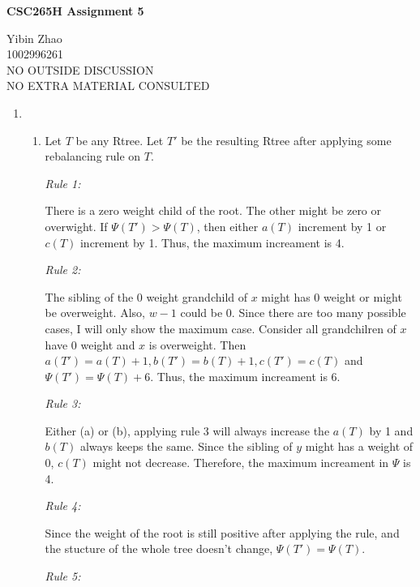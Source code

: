 \documentclass[10pt]{article}
\begin{document}
\begin{center}
{\bf \Large \bf CSC265H Assignment 5}
\end{center}

\noindent
Yibin Zhao\\
1002996261\\
NO OUTSIDE DISCUSSION\\
NO EXTRA MATERIAL CONSULTED\\

\begin{enumerate}
	\item 
		\begin{enumerate}
			\item
				Let $T$ be any Rtree.
				Let $T'$ be the resulting Rtree after applying some rebalancing
				rule on $T$. 
				
				\textit{Rule 1:}
				\begin{addmargin}[1em]{0em}
					There is a zero weight child of the root.
					The other might be zero or overwight.
					If $\Psi(T') > \Psi(T)$, then either $a(T)$ increment by 1
					or $c(T)$ increment by 1.
					Thus, the maximum increament is 4.
				\end{addmargin}
				\textit{Rule 2:}
				\begin{addmargin}[1em]{0em}
					The sibling of the 0 weight grandchild of $x$ might has 0
					weight or might be overweight.
					Also, $w-1$ could be 0.
					Since there are too many possible cases, I will only show
					the maximum case.
					Consider all grandchilren of $x$ have 0 weight and $x$ is overweight.
					Then $a(T') = a(T)+1, b(T') = b(T)+1, c(T') = c(T)$ and
					$\Psi(T') = \Psi(T) + 6$.
					Thus, the maximum increament is 6.
				\end{addmargin}
				\textit{Rule 3:}
				\begin{addmargin}[1em]{0em}
					Either (a) or (b), applying rule 3 will always increase the
					$a(T)$ by 1 and $b(T)$ always keeps the same.
					Since the sibling of $y$ might has a weight of 0, $c(T)$
					might not decrease.
					Therefore, the maximum increament in $\Psi$ is 4. 
				\end{addmargin}
				\textit{Rule 4:}
				\begin{addmargin}[1em]{0em}
					Since the weight of the root is still positive after
					applying the rule, and the stucture of the whole tree
					doesn't change, $\Psi(T') = \Psi(T)$.
				\end{addmargin}
				\textit{Rule 5:}
				\begin{addmargin}[1em]{0em}

\end{addmargin}
\end{enumerate}
\end{enumerate}
\end{document}
